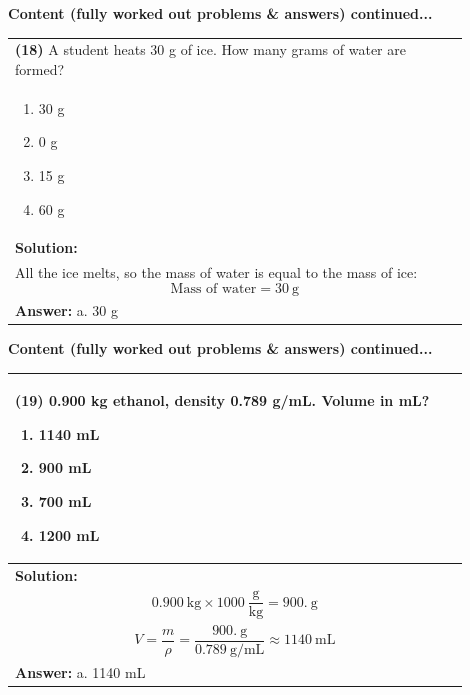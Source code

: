 \documentclass{article}
\begin{document}
{\newpage
\noindent
{\large\textbf{Content (fully worked out problems \& answers) continued...}}\\[0.2em]
\vspace{0.2cm}
\begin{tabular}{|p{0.9\linewidth}|}
\hline
\vspace{0.2cm}
\textbf{(18)} A student heats 30 g of ice. How many grams of water are formed? \\
\begin{minipage}[t]{0.85\linewidth}
\begin{enumerate}[label=\alph*.]
   \item 30 g
   \item 0 g
   \item 15 g
   \item 60 g
\end{enumerate}
\end{minipage}\\
\hline
\vspace{0.2cm}
\textbf{Solution:} \\
All the ice melts, so the mass of water is equal to the mass of ice:  
\[
\text{Mass of water} = 30~\text{g}
\] \\ 
\hline
\vspace{0.2cm}
\textbf{Answer:} a. 30 g \\
\hline
\end{tabular}


\newpage
\noindent
{\large\textbf{Content (fully worked out problems \& answers) continued...}}\\[0.2em]
\vspace{0.2cm}
\begin{tabular}{|p{0.9\linewidth}|}
\hline
\vspace{0.2cm}
\textbf{(19)} 0.900 kg ethanol, density 0.789 g/mL. Volume in mL?
\begin{minipage}[t]{0.85\linewidth}
\begin{enumerate}[label=\alph*.]
   \item 1140 mL
   \item 900 mL
   \item 700 mL
   \item 1200 mL
\end{enumerate}
\end{minipage}\\
\hline
\vspace{0.2cm}
\textbf{Solution:} \\

\[
0.900~\text{kg} \times 1000~\frac{\text{g}}{\text{kg}} = 900.~\text{g}
\] \\
\[
V = \frac{m}{\rho} = \frac{900.~\text{g}}{0.789~\text{g/mL}} \approx 1140~\text{mL}
\] \\ 
\hline
\vspace{0.2cm}
\textbf{Answer:} a. 1140 mL \\
\hline
\end{tabular}

}
\end{document}
